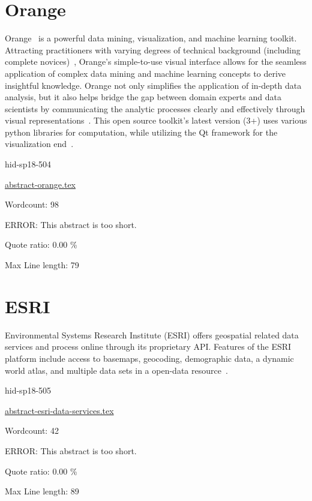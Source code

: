 \section{Orange}

Orange~\cite{hid-sp18-504-orange} is a powerful data mining, visualization, 
and machine learning toolkit. Attracting practitioners with varying degrees of
technical background (including complete novices)~\cite{hid-sp18-504-orange}, 
Orange's simple-to-use visual interface allows for the seamless application of 
complex data mining and machine learning concepts to derive insightful 
knowledge. Orange not only simplifies the application of in-depth data 
analysis, but it also helps bridge the gap between domain experts and 
data scientists by communicating the analytic processes clearly and 
effectively through visual representations~\cite{hid-sp18-504-orange}. 
This open source toolkit's latest version (3+) uses various python libraries 
for computation, while utilizing the Qt framework for the visualization 
end~\cite{hid-sp18-504-wiki-orange}.

\begin{IU}

hid-sp18-504

\href{https://github.com/cloudmesh-community/hid-sp18-504/blob/master//technology/abstract-orange.tex}{abstract-orange.tex}

 

Wordcount: 98

ERROR: This abstract is too short.


Quote ratio: 0.00 \%
 
Max Line length: 79
\end{IU}

\section{ESRI}

Environmental Systems Research Institute (ESRI) offers geospatial related data
services and process online through its proprietary API.  Features of the ESRI
platform include access to basemaps, geocoding, demographic data, a dynamic
world atlas, and multiple data sets in a open-data resource~\cite{hid-sp18-505-ESRI2018}.


\begin{IU}

hid-sp18-505

\href{https://github.com/cloudmesh-community/hid-sp18-505/blob/master//technology/abstract-esri-data-services.tex}{abstract-esri-data-services.tex}

 

Wordcount: 42

ERROR: This abstract is too short.


Quote ratio: 0.00 \%
 
Max Line length: 89
\end{IU}

